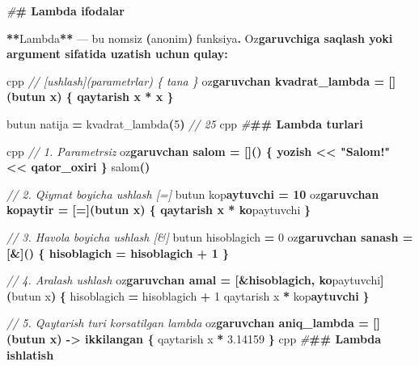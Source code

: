 \documentclass[a4paper,11pt,twoside,openright]{book}
\newenvironment{Shaded}{\begin{snugshade}}{\end{snugshade}}
\newcommand{\CharTok}[1]{\textcolor[rgb]{0.31,0.60,0.02}{#1}}
\newcommand{\CommentTok}[1]{\textcolor[rgb]{0.56,0.35,0.01}{\textit{#1}}}
\newcommand{\DecValTok}[1]{\textcolor[rgb]{0.00,0.00,0.81}{#1}}
\newcommand{\ErrorTok}[1]{\textcolor[rgb]{0.64,0.00,0.00}{\textbf{#1}}}
\newcommand{\FloatTok}[1]{\textcolor[rgb]{0.00,0.00,0.81}{#1}}
\newcommand{\NormalTok}[1]{#1}
\newcommand{\OperatorTok}[1]{\textcolor[rgb]{0.81,0.36,0.00}{\textbf{#1}}}
\newcommand{\PreprocessorTok}[1]{\textcolor[rgb]{0.56,0.35,0.01}{\textit{#1}}}
\begin{document}
\begin{Shaded}
\begin{Highlighting}[]
\PreprocessorTok{\#}\ErrorTok{\# Lambda ifodalar}

\OperatorTok{**}\NormalTok{Lambda}\OperatorTok{**}\NormalTok{ — bu nomsiz }\OperatorTok{(}\NormalTok{anonim}\OperatorTok{)}\NormalTok{ funksiya}\OperatorTok{.}\NormalTok{ O}\CharTok{\textquotesingle{}z}\ErrorTok{garuvchiga saqlash yoki argument sifatida uzatish uchun qulay:}

\ErrorTok{\textasciigrave{}\textasciigrave{}\textasciigrave{}}\NormalTok{cpp}
\CommentTok{// [ushlash](parametrlar) \{ tana \}}
\NormalTok{o}\CharTok{\textquotesingle{}z}\ErrorTok{garuvchan kvadrat\_lambda = [](butun x) \{ qaytarish x * x \}}

\NormalTok{butun natija }\OperatorTok{=}\NormalTok{ kvadrat\_lambda}\OperatorTok{(}\DecValTok{5}\OperatorTok{)}   \CommentTok{// 25}
\ErrorTok{\textasciigrave{}\textasciigrave{}\textasciigrave{}}\NormalTok{cpp}
\PreprocessorTok{\#}\ErrorTok{\#\# Lambda turlari}

\ErrorTok{\textasciigrave{}\textasciigrave{}\textasciigrave{}}\NormalTok{cpp}
\CommentTok{// 1. Parametrsiz}
\NormalTok{o}\CharTok{\textquotesingle{}z}\ErrorTok{garuvchan salom = []() \{ yozish \textless{}\textless{} "Salom!" \textless{}\textless{} qator\_oxiri \}}
\NormalTok{salom}\OperatorTok{()}

\CommentTok{// 2. Qiymat bo\textquotesingle{}yicha ushlash [=]}
\NormalTok{butun ko}\CharTok{\textquotesingle{}p}\ErrorTok{aytuvchi = 10}
\NormalTok{o}\CharTok{\textquotesingle{}z}\ErrorTok{garuvchan kopaytir = [=](butun x) \{ qaytarish x * ko}\CharTok{\textquotesingle{}}\NormalTok{paytuvchi }\OperatorTok{\}}

\CommentTok{// 3. Havola bo\textquotesingle{}yicha ushlash [\&]}
\NormalTok{butun hisoblagich }\OperatorTok{=} \DecValTok{0}
\NormalTok{o}\CharTok{\textquotesingle{}z}\ErrorTok{garuvchan sanash = [\&]() \{ hisoblagich = hisoblagich + 1 \}}

\CommentTok{// 4. Aralash ushlash}
\NormalTok{o}\CharTok{\textquotesingle{}z}\ErrorTok{garuvchan amal = [\&hisoblagich, ko}\CharTok{\textquotesingle{}}\NormalTok{paytuvchi}\OperatorTok{](}\NormalTok{butun x}\OperatorTok{)} \OperatorTok{\{}
\NormalTok{    hisoblagich }\OperatorTok{=}\NormalTok{ hisoblagich }\OperatorTok{+} \DecValTok{1}
\NormalTok{    qaytarish x }\OperatorTok{*}\NormalTok{ ko}\CharTok{\textquotesingle{}p}\ErrorTok{aytuvchi}
\OperatorTok{\}}

\CommentTok{// 5. Qaytarish turi ko\textquotesingle{}rsatilgan lambda}
\NormalTok{o}\CharTok{\textquotesingle{}z}\ErrorTok{garuvchan aniq\_lambda = [](butun x) {-}\textgreater{} ikkilangan \{}
\NormalTok{    qaytarish x }\OperatorTok{*} \FloatTok{3.14159}
\OperatorTok{\}}
\ErrorTok{\textasciigrave{}\textasciigrave{}\textasciigrave{}}\NormalTok{cpp}
\PreprocessorTok{\#}\ErrorTok{\#\# Lambda ishlatish}


\end{Highlighting}
\end{Shaded}
\end{document}
